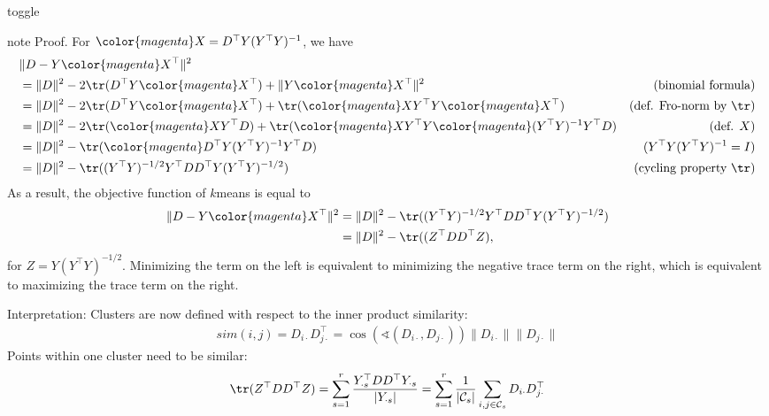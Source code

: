 \documentclass[letterpaper,10pt,english]{jupyterBook}
\begin{document}
\begin{sphinxuseclass}{toggle}
\begin{sphinxadmonition}{note}
\sphinxAtStartPar
Proof. For \({\color{magenta}X=D^\top Y(Y^\top Y)^{-1}}\), we have
\begin{align*}
    &\lVert D-Y{\color{magenta}X^\top}\rVert^2 \\
    &= \lVert D\rVert^2 -2\tr(D^\top Y{\color{magenta}X^\top} )+ \lVert Y{\color{magenta}X^\top}\rVert^2 &\text{(binomial formula)}\\
    &= \lVert D\rVert^2 -2\tr(D^\top Y{\color{magenta}X^\top})+ \tr( {\color{magenta}X}Y^\top Y {\color{magenta}X^\top})&\text{(def. Fro-norm by $\tr$)}\\
    &= \lVert D\rVert^2 -2\tr({\color{magenta}X}Y^\top D)+ \tr( {\color{magenta}X}Y^\top Y {\color{magenta}(Y^\top Y)^{-1}Y^\top D})&\text{(def. $X$)}\\
    &= \lVert D\rVert^2 -\tr({\color{magenta}D^\top Y(Y^\top Y)^{-1}}Y^\top D)&\text{($Y^\top Y(Y^\top Y)^{-1} =I$)}\\
    &= \lVert D\rVert^2 -\tr( (Y^\top Y)^{-1/2}Y^\top DD^\top Y (Y^\top Y)^{-1/2})&\text{(cycling property $\tr$)}
\end{align*}
\sphinxAtStartPar
As a result, the objective function of \(k\)\sphinxhyphen{}means is equal to
\begin{align*}
    \lVert D-Y{\color{magenta}X^\top}\rVert^2
    &= \lVert D\rVert^2 -\tr( (Y^\top Y)^{-1/2}Y^\top DD^\top Y (Y^\top Y)^{-1/2})\\
    &=\lVert D\rVert^2 -\tr( (Z^\top DD^\top Z),
\end{align*}
\sphinxAtStartPar
for \(Z =Y (Y^\top Y)^{-1/2} \).
Minimizing the term on the left is equivalent to minimizing the negative trace term on the right, which is equivalent to maximizing the trace term on the right.
\end{sphinxadmonition}

\end{sphinxuseclass}
\sphinxAtStartPar
Interpretation: Clusters are now defined with respect to the inner product similarity:
\begin{equation*}
\begin{split}sim(i,j) = D_{i\cdot}D_{j\cdot}^\top =\cos(\sphericalangle(D_{i\cdot},D_{j\cdot}))\lVert D_{i\cdot}\rVert\lVert D_{j\cdot}\rVert\end{split}
\end{equation*}
Points within one cluster need to be similar:
\begin{equation*}
\begin{split}\tr(Z^\top DD^\top Z)=\sum_{s=1}^r\frac{Y_{\cdot s}^\top DD^\top Y_{\cdot s}}{\lvert Y_{\cdot s}\rvert}
=\sum_{s=1}^r\frac{1}{\lvert \mathcal{C}_{s}\rvert}\sum_{i,j\in\mathcal{C}_s} D_{i\cdot}D_{j\cdot}^\top\end{split}
\end{equation*}
\end{document}
